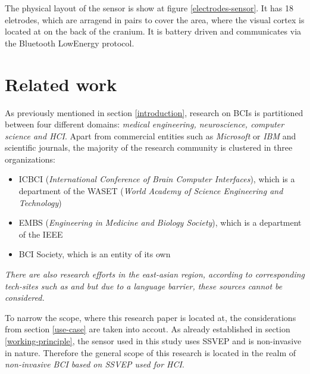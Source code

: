             The physical layout of the sensor is show at figure \ref*{electrodes-sensor}. It has 18 eletrodes, which are arragend in pairs to cover the area, where the visual cortex is located at on the back of the cranium. It is battery driven and communicates via the Bluetooth LowEnergy protocol.

        \section{Related work}\label{related-work}

            As previously mentioned in section \ref*{introduction}, research on BCIs is partitioned between four different domains: \textit{medical engineering, neuroscience, computer science and HCI}. Apart from commercial entities such as \textit{Microsoft} or \textit{IBM} and scientific journals, the majority of the research community is clustered in three organizations: 

            \begin{itemize}
                \item ICBCI (\textit{International Conference of Brain Computer Interfaces}), which is a department of the WASET (\textit{World Academy of Science Engineering and Technology})
                \item EMBS (\textit{Engineering in Medicine and Biology Society}), which is a department of the IEEE
                \item BCI Society, which is an entity of its own
            \end{itemize}

            \medskip

            \emph{There are also research efforts in the east-asian region, according to corresponding tech-sites such as \cite{GlobalTimes.20042021} and \cite{TechwireAsia.24052021} but due to a language barrier, these sources cannot be considered.}

            \medskip

            To narrow the scope, where this research paper is located at, the considerations from section \ref*{use-case} are taken into accout. As already established in section \ref*{working-principle}, the sensor used in this study uses SSVEP and is non-invasive in nature. Therefore the general scope of this research is located in the realm of \textit{non-invasive BCI based on SSVEP used for HCI}.

            \medskip

